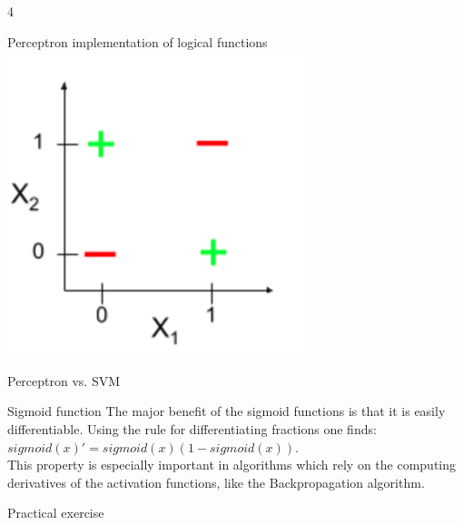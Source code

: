 \documentclass{article}
\begin{document}
\begin{ukon-infie}[22.11.17]{4}
\begin{exercise}[p=11]{Perceptron implementation of logical functions}
{        	\includegraphics[scale=0.5]{perceptron_XOR}
        	}
		
		\end{exercise}
		
		\begin{exercise}[p=4]{Perceptron vs. SVM}
		
		
		\end{exercise}
		
		\begin{exercise}[p=2]{Sigmoid function}
			The major benefit of the sigmoid functions is that it is easily differentiable. Using the rule for differentiating fractions one finds:\\
			$sigmoid(x)' = sigmoid(x)(1- sigmoid(x))$.\\
			This property is especially important in algorithms which rely on the computing derivatives of the activation functions, like the Backpropagation algorithm.
		\end{exercise}
		
		


		\begin{exercise}[p=7+2]{Practical exercise}
		

\end{exercise}
\end{ukon-infie}
\end{document}

